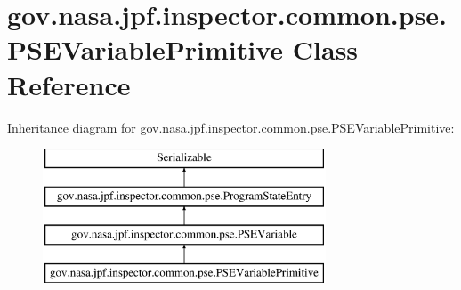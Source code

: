 \hypertarget{classgov_1_1nasa_1_1jpf_1_1inspector_1_1common_1_1pse_1_1_p_s_e_variable_primitive}{}\section{gov.\+nasa.\+jpf.\+inspector.\+common.\+pse.\+P\+S\+E\+Variable\+Primitive Class Reference}
\label{classgov_1_1nasa_1_1jpf_1_1inspector_1_1common_1_1pse_1_1_p_s_e_variable_primitive}
Inheritance diagram for gov.\+nasa.\+jpf.\+inspector.\+common.\+pse.\+P\+S\+E\+Variable\+Primitive\+:\begin{figure}[H]
\begin{center}
\leavevmode
\includegraphics[height=4.000000cm]{classgov_1_1nasa_1_1jpf_1_1inspector_1_1common_1_1pse_1_1_p_s_e_variable_primitive}
\end{center}
\end{figure}
